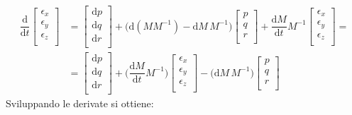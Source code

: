 \documentclass[11pt]{report}
\theoremstyle{plain}
\theoremstyle{definition}
\theoremstyle{remark}
\begin{document}
\begin{displaymath}\begin{split}
\dfrac{\textrm{d}}{\textrm{d}t}
\left[ \begin{array}{c} \epsilon _{x} \\ \epsilon _{y} \\ \epsilon _{z} \\ \end{array} \right] 
& = \left[ \begin{array}{c} \textrm{d}p \\ \textrm{d}q \\ \textrm{d}r \\ \end{array} \right] + \Bigr( \textrm{d}( M M^{-1}) - \textrm{d}M \, M^{-1} \Bigr) \left[ \begin{array}{c} p \\ q \\ r \\ \end{array} \right]  + \dfrac{\textrm{d}M}{\textrm{d}t} M^{-1} \left[ \begin{array}{c} \epsilon _{x} \\ \epsilon _{y} \\ \epsilon _{z} \\ \end{array} \right] = \\ &=
\left[ \begin{array}{c} \textrm{d}p \\ \textrm{d}q \\ \textrm{d}r \\ \end{array} \right] + \Bigr(
\dfrac{\textrm{d}M}{\textrm{d}t} M^{-1} \Bigr) \left[ \begin{array}{c} \epsilon _{x} \\ \epsilon _{y} \\ \epsilon _{z} \\ \end{array} \right] -\Bigr(\textrm{d}M \, M^{-1} \Bigr) \left[ \begin{array}{c} p \\ q \\ r \\ \end{array} \right]
\end{split}\end{displaymath}
Sviluppando le derivate si ottiene:
\end{document}
